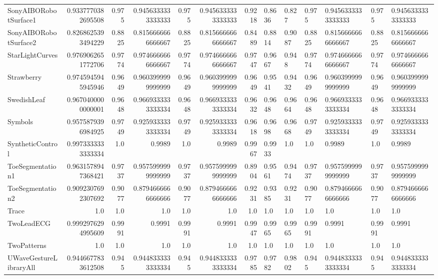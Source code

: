 \begin{table}[t]
\begin{tabular}{lrrrrrr}
SonyAIBORobotSurface1 & 0.9337770382695508 & 0.975 & 0.9456333333333333 & 0.975 & 0.9456333333333333 & 0.9218 & 0.8636 & 0.827 & 0.975 & 0.9456333333333333 & 0.975 & 0.9456333333333333 \\
SonyAIBORobotSurface2 & 0.8268625393494229 & 0.8825 & 0.8156666666666667 & 0.8825 & 0.8156666666666667 & 0.8489 & 0.8814 & 0.9087 & 0.8825 & 0.8156666666666667 & 0.8825 & 0.8156666666666667 \\
StarLightCurves & 0.9769062651772706 & 0.9774 & 0.9746666666666667 & 0.9774 & 0.9746666666666667 & 0.9747 & 0.9667 & 0.948 & 0.9774 & 0.9746666666666667 & 0.9774 & 0.9746666666666667 \\
Strawberry & 0.9745945945945946 & 0.9649 & 0.9603999999999999 & 0.9649 & 0.9603999999999999 & 0.9649 & 0.9541 & 0.9432 & 0.9649 & 0.9603999999999999 & 0.9649 & 0.9603999999999999 \\
SwedishLeaf & 0.9670400000000001 & 0.9648 & 0.9669333333333334 & 0.9648 & 0.9669333333333334 & 0.9632 & 0.9648 & 0.9664 & 0.9648 & 0.9669333333333334 & 0.9648 & 0.9669333333333334 \\
Symbols & 0.9575879396984925 & 0.9749 & 0.9259333333333334 & 0.9749 & 0.9259333333333334 & 0.9618 & 0.9698 & 0.9668 & 0.9749 & 0.9259333333333334 & 0.9749 & 0.9259333333333334 \\
SyntheticControl & 0.9973333333333334 & 1.0 & 0.9989 & 1.0 & 0.9989 & 0.9967 & 0.9933 & 1.0 & 1.0 & 0.9989 & 1.0 & 0.9989 \\
ToeSegmentation1 & 0.9631578947368421 & 0.9737 & 0.9575999999999999 & 0.9737 & 0.9575999999999999 & 0.8904 & 0.9561 & 0.9474 & 0.9737 & 0.9575999999999999 & 0.9737 & 0.9575999999999999 \\
ToeSegmentation2 & 0.9092307692307692 & 0.9077 & 0.8794666666666666 & 0.9077 & 0.8794666666666666 & 0.9231 & 0.9385 & 0.9231 & 0.9077 & 0.8794666666666666 & 0.9077 & 0.8794666666666666 \\
Trace & 1.0 & 1.0 & 1.0 & 1.0 & 1.0 & 1.0 & 1.0 & 1.0 & 1.0 & 1.0 & 1.0 & 1.0 \\
TwoLeadECG & 0.9992976294995609 & 0.9991 & 0.9991 & 0.9991 & 0.9991 & 0.9947 & 0.9965 & 0.9965 & 0.9991 & 0.9991 & 0.9991 & 0.9991 \\
TwoPatterns & 1.0 & 1.0 & 1.0 & 1.0 & 1.0 & 1.0 & 1.0 & 1.0 & 1.0 & 1.0 & 1.0 & 1.0 \\
UWaveGestureLibraryAll & 0.9446677833612508 & 0.945 & 0.9448333333333334 & 0.945 & 0.9448333333333334 & 0.9785 & 0.9782 & 0.9802 & 0.945 & 0.9448333333333334 & 0.945 & 0.9448333333333334 \\

\end{tabular}
\end{table}
